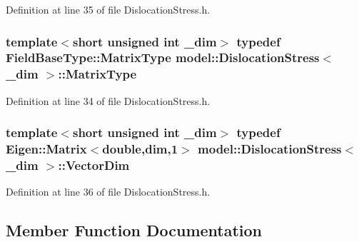 Definition at line 35 of file Dislocation\+Stress.\+h.

\hypertarget{structmodel_1_1_dislocation_stress_a58cfb5429639657d58da42d9c3854505}{}
\subsubsection[{Matrix\+Type}]{\setlength{\rightskip}{0pt plus 5cm}template$<$short unsigned int \+\_\+dim$>$ typedef {\bf Field\+Base\+Type\+::\+Matrix\+Type} {\bf model\+::\+Dislocation\+Stress}$<$ \+\_\+dim $>$\+::{\bf Matrix\+Type}}\label{structmodel_1_1_dislocation_stress_a58cfb5429639657d58da42d9c3854505}


Definition at line 34 of file Dislocation\+Stress.\+h.

\hypertarget{structmodel_1_1_dislocation_stress_ac1462cad65fdf33aa42341301aee8c48}{}
\subsubsection[{Vector\+Dim}]{\setlength{\rightskip}{0pt plus 5cm}template$<$short unsigned int \+\_\+dim$>$ typedef Eigen\+::\+Matrix$<$double,{\bf dim},1$>$ {\bf model\+::\+Dislocation\+Stress}$<$ \+\_\+dim $>$\+::{\bf Vector\+Dim}}\label{structmodel_1_1_dislocation_stress_ac1462cad65fdf33aa42341301aee8c48}


Definition at line 36 of file Dislocation\+Stress.\+h.



\subsection{Member Function Documentation}
\hypertarget{structmodel_1_1_dislocation_stress_a0c98dd0d842387db2f3480fd3340ece8}{}

